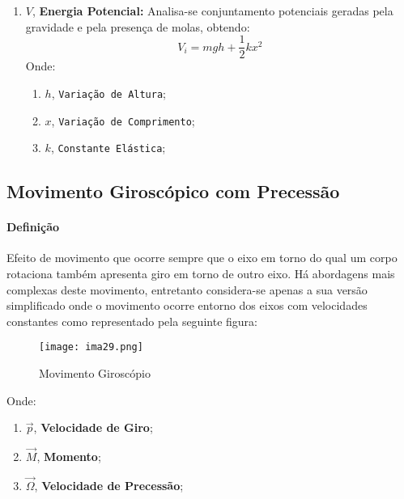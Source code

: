 \documentclass{article}
\begin{document}
\begin{enumerate}[rightmargin = \leftmargin]
                    \item $V$, \textbf{Energia Potencial:} Analisa-se conjuntamento potenciais geradas pela gravidade e pela presença de molas, obtendo:
                        \begin{equation}
                            \boxed{
                                V_{i} = 
                                m g h +
                                \frac{1}{2} k x^{2} 
                            }
                        \end{equation}
                    Onde:
                        \begin{enumerate}[rightmargin = \leftmargin, noitemsep]
                            \item $h$, \texttt{Variação de Altura};
                            \item $x$, \texttt{Variação de Comprimento};
                            \item $k$, \texttt{Constante Elástica};
                        \end{enumerate}
                \end{enumerate}
\newpage

        \subsection{Movimento Giroscópico com Precessão}
            \paragraph{Definição}Efeito de movimento que ocorre sempre que o eixo em torno do qual um corpo rotaciona também apresenta giro em torno de outro eixo. Há abordagens mais complexas deste movimento, entretanto considera-se apenas a sua versão simplificado onde o movimento ocorre entorno dos eixos com velocidades constantes como representado pela seguinte figura:
                \begin{figure}[H]
                    \centering
                    \texttt{[image: ima29.png]}
                    \caption{Movimento Giroscópio}
                \end{figure}\noindent
            Onde:
                \begin{enumerate}[rightmargin = \leftmargin]
                    \item $\vec{p}$, \textbf{Velocidade de Giro};
                    \item $\vec{M}$, \textbf{Momento};
                    \item $\vec{\Omega}$, \textbf{Velocidade de Precessão};
                \end{enumerate}
\end{document}

